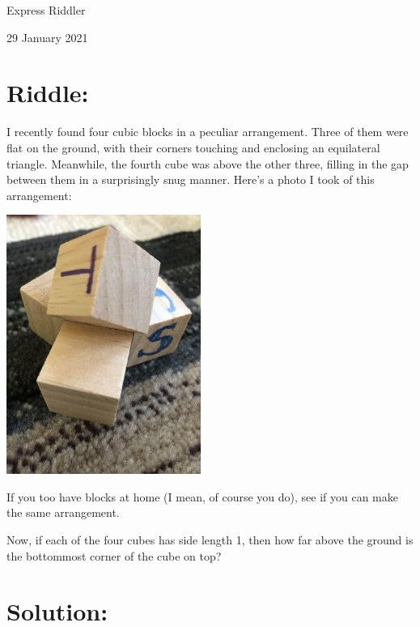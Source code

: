 \documentclass{article}
\begin{document}
\pagestyle{empty} %

\begin{center}
{\LARGE Express Riddler}

\vspace{0.15in}

{\Large 29 January 2021}
\end{center}


\section*{Riddle:}

I recently found four cubic blocks in a peculiar arrangement.
Three of them were flat on the ground, with their corners touching and enclosing an equilateral triangle.
Meanwhile, the fourth cube was above the other three, filling in the gap between them in a surprisingly snug manner.
Here's a photo I took of this arrangement:

\vspace{0.1in}
\begin{center}
\includegraphics[width=2.5in]{four_cubes.jpg}
\end{center}
\vspace{0.1in}

If you too have blocks at home (I mean, of course you do), see if you can make the same arrangement.

Now, if each of the four cubes has side length 1, then how far above the ground is the bottommost corner of the cube on top?

\section*{Solution:}
\end{document}
